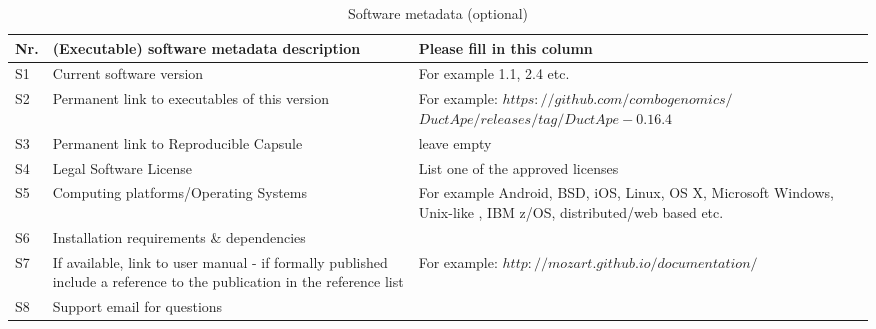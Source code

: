 \documentclass[preprint,12pt, a4paper]{elsarticle}
\begin{document}
\begin{table}[!h]
\begin{tabular}{|l|p{6.5cm}|p{6.5cm}|}
\hline
\textbf{Nr.} & \textbf{(Executable) software metadata description} & \textbf{Please fill in this column} \\
\hline
S1 & Current software version & For example 1.1, 2.4 etc. \\
\hline
S2 & Permanent link to executables of this version  & For example: $https://github.com/combogenomics/$ $DuctApe/releases/tag/DuctApe-0.16.4$ \\
\hline
S3  & Permanent link to Reproducible Capsule & leave empty \\
\hline
S4 & Legal Software License & List one of the approved licenses \\
\hline
S5 & Computing platforms/Operating Systems & For example Android, BSD, iOS, Linux, OS X, Microsoft Windows, Unix-like , IBM z/OS, distributed/web based etc. \\
\hline
S6 & Installation requirements \& dependencies & \\
\hline
S7 & If available, link to user manual - if formally published include a reference to the publication in the reference list & For example: $http://mozart.github.io/documentation/$ \\
\hline
S8 & Support email for questions & \\
\hline
\end{tabular}
\caption{Software metadata (optional)}
\label{} 
\end{table}
\end{document}
